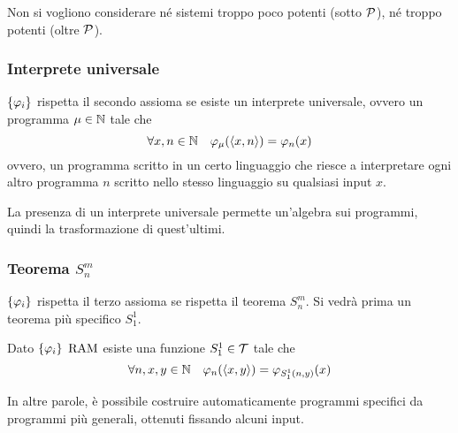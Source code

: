 Non si vogliono considerare né sistemi troppo poco potenti (sotto $\mathcal{P}$), né troppo potenti (oltre $\mathcal{P}$).

\subsubsection{Interprete universale}

$\{\varphi_i\}$ rispetta il secondo assioma se esiste un interprete universale, ovvero un programma $\mu \in \mathbb{N}$ tale che
$$ \forall x,n \in \mathbb{N} \quad \varphi_\mu (\langle x,n \rangle) = \varphi_n (x) $$
ovvero, un programma scritto in un certo linguaggio che riesce a interpretare ogni altro programma $n$ scritto nello stesso linguaggio su qualsiasi input $x$.

La presenza di un interprete universale permette un'algebra sui programmi, quindi la trasformazione di quest'ultimi.

\subsubsection{Teorema $S_n^m$}

$\{\varphi_i\}$ rispetta il terzo assioma se rispetta il teorema $S_n^m$. Si vedrà prima un teorema più specifico $S_1^1$. \\

\begin{theor}[$S_1^1$]
	Dato $\{\varphi_i\}$ $\text{RAM}$ esiste una funzione $S_1^1 \in \mathcal{T}$ tale che
	$$ \forall n,x,y \in \mathbb{N} \quad \varphi_n(\langle x,y \rangle) = \varphi_{S_1^1 (n,y)} (x) $$
    
    In altre parole, è possibile costruire automaticamente programmi specifici da programmi più generali, ottenuti fissando alcuni input.
\end{theor}

